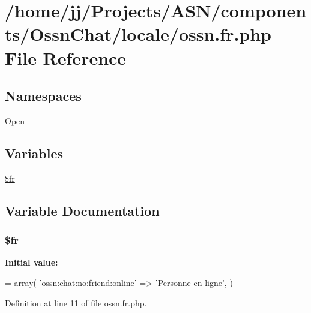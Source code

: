 \hypertarget{components_2_ossn_chat_2locale_2ossn_8fr_8php}{}\section{/home/jj/\+Projects/\+A\+S\+N/components/\+Ossn\+Chat/locale/ossn.fr.\+php File Reference}
\label{components_2_ossn_chat_2locale_2ossn_8fr_8php}
\subsection*{Namespaces}
\begin{DoxyCompactItemize}
\item 
 \hyperlink{namespace_open}{Open}
\end{DoxyCompactItemize}
\subsection*{Variables}
\begin{DoxyCompactItemize}
\item 
\hyperlink{components_2_ossn_chat_2locale_2ossn_8fr_8php_ad5107c697816e7b7f89ad1b3e94e3e0e}{\$fr}
\end{DoxyCompactItemize}


\subsection{Variable Documentation}
\subsubsection[{\texorpdfstring{\$fr}{$fr}}]{\setlength{\rightskip}{0pt plus 5cm}\$fr}\hypertarget{components_2_ossn_chat_2locale_2ossn_8fr_8php_ad5107c697816e7b7f89ad1b3e94e3e0e}{}\label{components_2_ossn_chat_2locale_2ossn_8fr_8php_ad5107c697816e7b7f89ad1b3e94e3e0e}
{\bfseries Initial value\+:}
\begin{DoxyCode}
= array(
    \textcolor{stringliteral}{'ossn:chat:no:friend:online'} => \textcolor{stringliteral}{'Personne en ligne'},
)
\end{DoxyCode}


Definition at line 11 of file ossn.\+fr.\+php.

